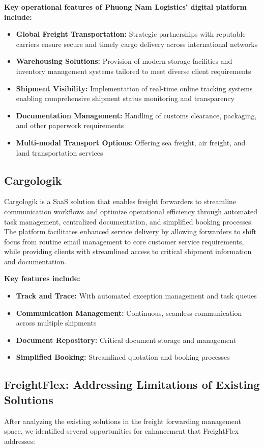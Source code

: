 \textbf{Key operational features of Phuong Nam Logistics' digital platform include:}
\begin{itemize}
    \item \textbf{Global Freight Transportation:} Strategic partnerships with reputable carriers ensure secure and timely cargo delivery across international networks
    \item \textbf{Warehousing Solutions:} Provision of modern storage facilities and inventory management systems tailored to meet diverse client requirements
    \item \textbf{Shipment Visibility:} Implementation of real-time online tracking systems enabling comprehensive shipment status monitoring and transparency
    \item \textbf{Documentation Management:} Handling of customs clearance, packaging, and other paperwork requirements
    \item \textbf{Multi-modal Transport Options:} Offering sea freight, air freight, and land transportation services
\end{itemize}

\subsection{Cargologik}
Cargologik is a SaaS solution that enables freight forwarders to streamline communication workflows and optimize operational efficiency through automated task management, centralized documentation, and simplified booking processes. The platform facilitates enhanced service delivery by allowing forwarders to shift focus from routine email management to core customer service requirements, while providing clients with streamlined access to critical shipment information and documentation.

\textbf{Key features include:}
\begin{itemize}
    \item \textbf{Track and Trace:} With automated exception management and task queues
    \item \textbf{Communication Management:} Continuous, seamless communication across multiple shipments
    \item \textbf{Document Repository:} Critical document storage and management
    \item \textbf{Simplified Booking:} Streamlined quotation and booking processes
\end{itemize}
\subsection{FreightFlex: Addressing Limitations of Existing Solutions}
After analyzing the existing solutions in the freight forwarding management space, we identified several opportunities for enhancement that FreightFlex addresses:

